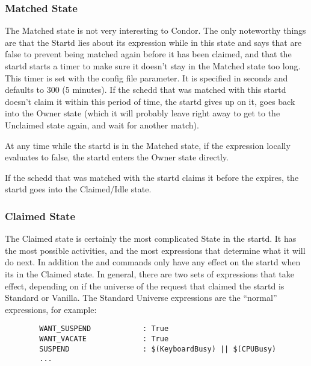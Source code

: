 \subsubsection{Matched State}
\label{sec:Matched-State}

The Matched state is not very interesting to Condor.  The only
noteworthy things are that the Startd lies about its 
expression while in this state and says that  are
false to prevent being matched again before it has been claimed, and
that the startd starts a timer to make sure it doesn't stay in the
Matched state too long.  This timer is set with the
 \label{param:MatchTimeout} config file
parameter.  It is specified in seconds and defaults to 300 (5
minutes).  If the schedd that was matched with this startd doesn't
claim it within this period of time, the startd gives up on it, goes
back into the Owner state (which it will probably leave right away to
get to the Unclaimed state again, and wait for another match).

At any time while the startd is in the Matched state, if the
 expression locally evaluates to false, the startd enters
the Owner state directly.

If the schedd that was matched with the startd claims it before the
 expires, the startd goes into the Claimed/Idle
state.

\subsubsection{Claimed State}
\label{sec:Claimed-State}

The Claimed state is certainly the most complicated State in the
startd.  It has the most possible activities, and the most expressions
that determine what it will do next.  In addition the
 and  commands only have any effect
on the startd when its in the Claimed state.  In general, there are
two sets of expressions that take effect, depending on if the universe
of the request that claimed the startd is Standard or Vanilla.  The
Standard Universe expressions are the ``normal'' expressions, for
example:

\begin{verbatim}
        WANT_SUSPEND            : True
        WANT_VACATE             : True
        SUSPEND                 : $(KeyboardBusy) || $(CPUBusy)
        ...
\end{verbatim}

